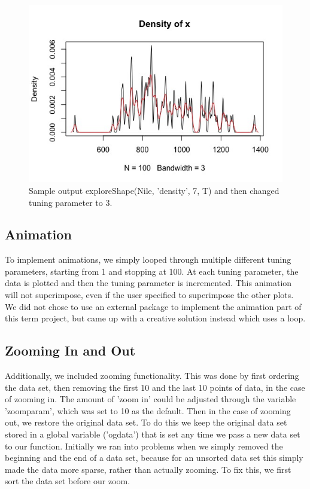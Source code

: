 \documentclass{article}
\begin{document}
\begin{figure}[H]
\centering
\includegraphics[scale=0.5]{Nile, 7 superimposed on 3.jpeg}
\caption{Sample output exploreShape(Nile, 'density', 7, T) and then changed tuning parameter to 3. }
\label{fig:Nile density graph 3 on 7}
\end{figure}

\subsection{Animation}
To implement animations, we simply looped through multiple different tuning parameters, starting from 1 and stopping at 100. At each tuning parameter, the data is plotted and then the tuning parameter is incremented. This animation will not superimpose, even if the user specified to superimpose the other plots. We did not chose to use an external package to implement the animation part of this term project, but came up with a creative solution instead which uses a loop.

\subsection{Zooming In and Out}
Additionally, we included zooming functionality. This was done by first ordering the data set, then removing the first 10 and the last 10 points of data, in the case of zooming in. The amount of 'zoom in' could be adjusted through the variable 'zoomparam', which was set to 10 as the default. Then in the case of zooming out, we restore the original data set. To do this we keep the original data set stored in a global variable ('ogdata') that is set any time we pass a new data set to our function. Initially we ran into problems when we simply removed the beginning and the end of a data set, because for an unsorted data set this simply made the data more sparse, rather than actually zooming. To fix this, we first sort the data set before our zoom.
\end{document}
